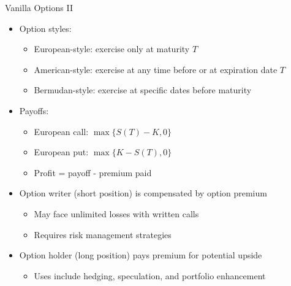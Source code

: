 \documentclass[10pt]{beamer}
\begin{document}
\begin{frame}{Vanilla Options II}
  \begin{itemize}[<+->]
    \item Option styles:
      \begin{itemize}
        \item European-style: exercise only at maturity $T$
        \item American-style: exercise at any time before or at expiration date $T$
        \item Bermudan-style: exercise at specific dates before maturity
      \end{itemize}
    \item Payoffs:
      \begin{itemize}
        \item European call: $\max\{S(T) - K, 0\}$
        \item European put: $\max\{K - S(T), 0\}$
        \item Profit = payoff - premium paid
      \end{itemize}
    \item Option writer (short position) is compensated by option premium
      \begin{itemize}
        \item May face unlimited losses with written calls
        \item Requires risk management strategies
      \end{itemize}
    \item Option holder (long position) pays premium for potential upside
      \begin{itemize}
        \item Uses include hedging, speculation, and portfolio enhancement
      \end{itemize}
  \end{itemize}
\end{frame}
\end{document}
